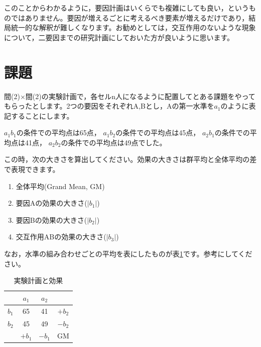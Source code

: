 \documentclass{ltjbook}
\begin{document}
このことからわかるように，要因計画はいくらでも複雑にしても良い，というものではありません。要因が増えるごとに考えるべき要素が増えるだけであり，結局統一的な解釈が難しくなります。お勧めとしては，交互作用のないような現象について，二要因までの研究計画にしておいた方が良いように思います。

\section{課題}
間(2)$\times$間(2)の実験計画で，各セルn人になるように配置してとある課題をやってもらったとします。2つの要因をそれぞれA,Bとし，Aの第一水準を$a_1$のように表記することにします。

$a_1b_1$の条件での平均点は65点，
$a_1b_2$の条件での平均点は45点，
$a_2b_1$の条件での平均点は41点，
$a_2b_2$の条件での平均点は49点でした。


この時，次の大きさを算出してください。効果の大きさは群平均と全体平均の差で表現できます。
\begin{enumerate}
	\item 全体平均(Grand Mean, GM)
	\item 要因Aの効果の大きさ($|b_1|$)
	\item 要因Bの効果の大きさ($|b_2|$)
	\item 交互作用ABの効果の大きさ($|b_3|$)
\end{enumerate}

なお，水準の組み合わせごとの平均を表にしたものが表\ref{tbl::13_05}です。参考にしてください。

\begin{table}[ht]
	\centering
	\caption{実験計画と効果}
	\begin{tabular}{c|cc|c}
		      & $a_1$  & $a_2$  &        \\\hline
		$b_1$ & 65     & 41     & $+b_2$ \\
		$b_2$ & 45     & 49     & $-b_2$ \\\hline
		      & $+b_1$ & $-b_1$ & GM
	\end{tabular}
	\label{tbl::13_05}
\end{table}
\end{document}
